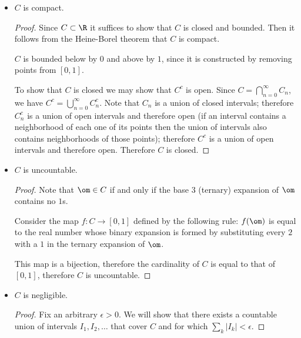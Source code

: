 \begin{itemize}
\item
  \begin{claim*}
    $C$ is compact.
  \end{claim*}
  \begin{proof} 
    Since $C \subset \R$ it suffices to show that $C$ is closed and bounded. Then it follows from the Heine-Borel
    theorem that $C$ is compact.

    $C$ is bounded below by $0$ and above by $1$, since it is constructed by removing points from $[0, 1]$.

    To show that $C$ is closed we may show that $C^c$ is open. Since $C = \bigcap_{n=0}^\infty C_n$, we
    have $C^c = \bigcup_{n=0}^\infty C_n^c$. Note that $C_n$ is a union of closed intervals; therefore $C_n^c$
    is a union of open intervals and therefore open (if an interval contains a neighborhood of each one of its
    points then the union of intervals also contains neighborhoods of those points); therefore $C^c$ is a union
    of open intervals and therefore open. Therefore $C$ is closed.
  \end{proof}

\item
  \begin{claim*}
    $C$ is uncountable.
  \end{claim*}

  \begin{proof} 
    Note that $\om \in C$ if and only if the base 3 (ternary) expansion of $\om$ contains no $1$s.

    Consider the map $f:C \to [0, 1]$ defined by the following rule: $f(\om)$ is equal to the real number whose
    binary expansion is formed by substituting every $2$ with a $1$ in the ternary expansion of $\om$.

    This map is a bijection, therefore the cardinality of $C$ is equal to that of $[0, 1]$, therefore $C$ is
    uncountable.
  \end{proof}

\item \begin{claim*}
    $C$ is negligible.
  \end{claim*}

  \begin{proof}
    Fix an arbitrary $\epsilon > 0$. We will show that there exists a countable union of
    intervals $I_1, I_2, \ldots$ that cover $C$ and for which $\sum_k |I_k| < \epsilon$.


\end{proof}
\end{itemize}
